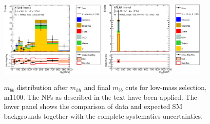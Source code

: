 \begin{figure}
\begin{center}
\includegraphics*[width=0.47\textwidth] {figures/Unblinded_mbb/C_reOpt700_mww_bbpt210_wwpt250_hh1100_bbMass_regionA_met25d020.eps}
\includegraphics*[width=0.47\textwidth] {figures/Unblinded_mbb/C_reOpt700_mww_bbpt210_wwpt250_hh1100_mbb_bbMass_regionA_met25d020.eps}
\caption[$m_{bb}$ distribution after $m_{hh}$ and final $m_{bb}$ cuts for low-mass selection, m1100.]{$m_{bb}$ distribution after $m_{hh}$ and final $m_{bb}$ cuts for low-mass selection, m1100. The NFs as described in the text have been applied. The lower panel shows the comparison of data and expected SM backgrounds together with the complete systematics uncertainties.}
\end{center}
\end{figure}

